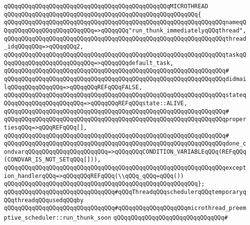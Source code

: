 \verb|qQQqqQQqqQQqqQQqqQQqqQQqqQQqqQQqqQQqqQQqqQQqqQQqMICROTHREAD|\newline
\verb|qQQqqQQqqQQqqQQqqQQqqQQqqQQqqQQqqQQqqQQqqQQqqQQqqQQqqQQq{|\newline
\verb|qQQqqQQqqQQqqQQqqQQqqQQqqQQqqQQqqQQqqQQqqQQqqQQqqQQqqQQqqQQqqQQqnameqQQqqQQqqQQqqQQqqQQqqQQqqQQq=>qQQqqQQq"run_thunk_immediatelyqQQqthread",|\newline
\verb|qQQqqQQqqQQqqQQqqQQqqQQqqQQqqQQqqQQqqQQqqQQqqQQqqQQqqQQqqQQqqQQqthread_idqQQqqQQq=>qQQqqQQq2,|\newline
\verb|qQQqqQQqqQQqqQQqqQQqqQQqqQQqqQQqqQQqqQQqqQQqqQQqqQQqqQQqqQQqqQQqtaskqQQqqQQqqQQqqQQqqQQqqQQqqQQq=>qQQqqQQqdefault_task,|\newline
\verb|qQQqqQQqqQQqqQQqqQQqqQQqqQQqqQQqqQQqqQQqqQQqqQQqqQQqqQQqqQQqqQQq#|\newline
\verb|qQQqqQQqqQQqqQQqqQQqqQQqqQQqqQQqqQQqqQQqqQQqqQQqqQQqqQQqqQQqqQQqdidmailqQQqqQQqqQQqqQQq=>qQQqqQQqREFqQQqFALSE,|\newline
\verb|qQQqqQQqqQQqqQQqqQQqqQQqqQQqqQQqqQQqqQQqqQQqqQQqqQQqqQQqqQQqqQQqstateqQQqqQQqqQQqqQQqqQQqqQQq=>qQQqqQQqREFqQQqstate::ALIVE,|\newline
\verb|qQQqqQQqqQQqqQQqqQQqqQQqqQQqqQQqqQQqqQQqqQQqqQQqqQQqqQQqqQQqqQQq#|\newline
\verb|qQQqqQQqqQQqqQQqqQQqqQQqqQQqqQQqqQQqqQQqqQQqqQQqqQQqqQQqqQQqqQQqpropertiesqQQq=>qQQqREFqQQq[],|\newline
\verb|qQQqqQQqqQQqqQQqqQQqqQQqqQQqqQQqqQQqqQQqqQQqqQQqqQQqqQQqqQQqqQQq#|\newline
\verb|qQQqqQQqqQQqqQQqqQQqqQQqqQQqqQQqqQQqqQQqqQQqqQQqqQQqqQQqqQQqqQQqdone_condvarqQQqqQQqqQQqqQQqqQQqqQQq=>qQQqqQQqCONDITION_VARIABLEqQQq(REFqQQq(CONDVAR_IS_NOT_SETqQQq[])),|\newline
\verb|qQQqqQQqqQQqqQQqqQQqqQQqqQQqqQQqqQQqqQQqqQQqqQQqqQQqqQQqqQQqqQQqexception_handlerqQQq=>qQQqqQQqREFqQQq(\\qQQq_qQQq=qQQq())|\newline
\verb|qQQqqQQqqQQqqQQqqQQqqQQqqQQqqQQqqQQqqQQqqQQqqQQqqQQqqQQq};|\newline
\newline
\verb|qQQqqQQqqQQqqQQqqQQqqQQqqQQqqQQq#qQQqThreadqQQqschedulerqQQqtemporaryqQQqthreadqQQqusedqQQqby|\newline
\verb|qQQqqQQqqQQqqQQqqQQqqQQqqQQqqQQq#qQQqqQQqqQQqqQQqqQQqmicrothread_preemptive_scheduler::run_thunk_soon|\newline
\verb|qQQqqQQqqQQqqQQqqQQqqQQqqQQqqQQq#|\newline
